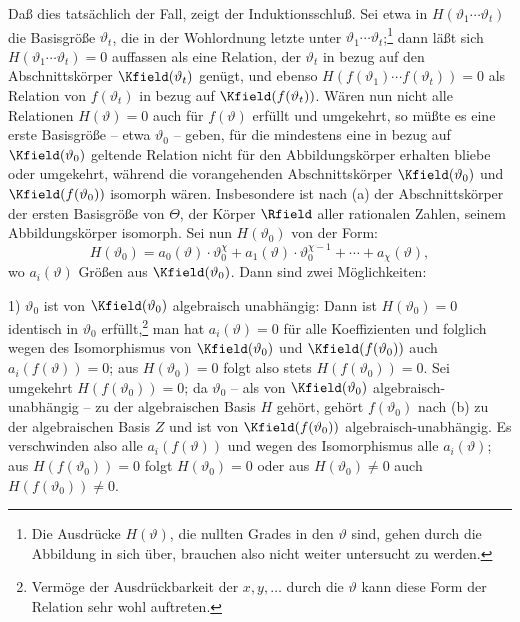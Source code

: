\documentclass[11pt]{article}
\begin{document}
Daß dies tatsächlich der Fall, zeigt der Induktionsschluß. Sei etwa in \(H(\vartheta_1\cdots\vartheta_t)\) die Basisgröße \(\vartheta_t\), die in der Wohlordnung letzte unter \(\vartheta_1\cdots\vartheta_t\);\footnote{Die Ausdrücke \(H(\vartheta)\), die nullten Grades in den \(\vartheta\) sind, gehen durch die Abbildung in sich über, brauchen also nicht weiter untersucht zu werden.} dann läßt sich \(H(\vartheta_1\cdots\vartheta_t)=0\) auffassen als eine Relation, der \(\vartheta_t\) in bezug auf den Abschnittskörper \(\Kfield(\vartheta_t)\) genügt, und ebenso \(H(f(\vartheta_1)\cdots f(\vartheta_t))=0\) als Relation von \(f(\vartheta_t)\) in bezug auf \(\Kfield(f(\vartheta_t))\). Wären nun nicht alle Relationen \(H(\vartheta)=0\) auch für \(f(\vartheta)\) erfüllt und umgekehrt, so müßte es eine erste Basisgröße -- etwa \(\vartheta_0\) -- geben, für die mindestens eine in bezug auf \(\Kfield(\vartheta_0)\) geltende Relation nicht für den Abbildungskörper erhalten bliebe oder umgekehrt, während die vorangehenden Abschnittskörper \(\Kfield(\vartheta_0)\) und \(\Kfield(f(\vartheta_0))\) isomorph wären. Insbesondere ist nach (a) der Abschnittskörper der ersten Basisgröße von \(\Theta\), der Körper \(\Rfield\) aller rationalen Zahlen, seinem Abbildungskörper isomorph. Sei nun \(H(\vartheta_0)\) von der Form:
\[
H(\vartheta_0)=a_0(\vartheta)\cdot\vartheta_0^\chi
+a_1(\vartheta)\cdot\vartheta_0^{\chi-1}+\cdots+a_\chi(\vartheta),
\]
wo \(a_i(\vartheta)\) Größen aus \(\Kfield(\vartheta_0)\). Dann sind zwei Möglichkeiten:

1) \(\vartheta_0\) ist von \(\Kfield(\vartheta_0)\) algebraisch unabhängig: Dann ist \(H(\vartheta_0)=0\) identisch in \(\vartheta_0\) erfüllt,\footnote{Vermöge der Ausdrückbarkeit der \(x,y,\ldots\) durch die \(\vartheta\) kann diese Form der Relation sehr wohl auftreten.} man hat \(a_i(\vartheta)=0\) für alle Koeffizienten und folglich wegen des Isomorphismus von \(\Kfield(\vartheta_0)\) und \(\Kfield(f(\vartheta_0))\) auch \(a_i(f(\vartheta))=0\); aus \(H(\vartheta_0)=0\) folgt also stets \(H(f(\vartheta_0))=0\). Sei umgekehrt \(H(f(\vartheta_0))=0\); da \(\vartheta_0\) -- als von \(\Kfield(\vartheta_0)\) algebraisch-unabhängig -- zu der algebraischen Basis \(H\) gehört, gehört \(f(\vartheta_0)\) nach (b) zu der algebraischen Basis \(Z\) und ist von \(\Kfield(f(\vartheta_0))\) algebraisch-unabhängig. Es verschwinden also alle \(a_i(f(\vartheta))\) und wegen des Isomorphismus alle \(a_i(\vartheta)\); aus \(H(f(\vartheta_0))=0\) folgt \(H(\vartheta_0)=0\) oder aus \(H(\vartheta_0)\ne0\) auch \(H(f(\vartheta_0))\ne0\).
\end{document}
